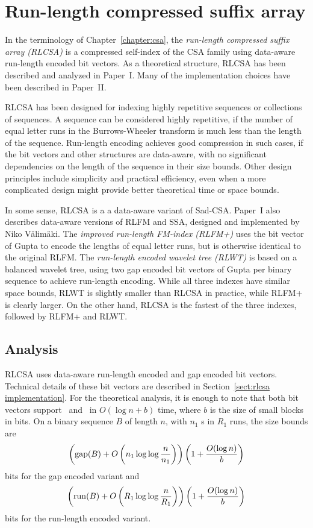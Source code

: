 \chapter{Run-length compressed suffix array}\label{chapter:rlcsa}

In the terminology of Chapter~\ref{chapter:csa}, the \emph{run-length compressed suffix array (RLCSA)} is a compressed self-index of the CSA family using data-aware run-length encoded bit vectors. As a theoretical structure, RLCSA has been described and analyzed in Paper~I. Many of the implementation choices have been described in Paper~II.

RLCSA has been designed for indexing highly repetitive sequences or collections of sequences. A sequence can be considered highly repetitive, if the number of equal letter runs in the Burrows-Wheeler transform is much less than the length of the sequence. Run-length encoding achieves good compression in such cases, if the bit vectors and other structures are data-aware, with no significant dependencies on the length of the sequence in their size bounds. Other design principles include simplicity and practical efficiency, even when a more complicated design might provide better theoretical time or space bounds.

In some sense, RLCSA is a a data-aware variant of Sad-CSA. Paper~I also describes data-aware versions of RLFM and SSA, designed and implemented by Niko Välimäki. The \emph{improved run-length FM-index (RLFM+)} uses the bit vector of Gupta  to encode the lengths of equal letter runs, but is otherwise identical to the original RLFM. The \emph{run-length encoded wavelet tree (RLWT)} is based on a balanced wavelet tree, using two gap encoded bit vectors of Gupta  per binary sequence to achieve run-length encoding. While all three indexes have similar space bounds, RLWT is slightly smaller than RLCSA in practice, while RLFM+ is clearly larger. On the other hand, RLCSA is the fastest of the three indexes, followed by RLFM+ and RLWT.
\newpage

\section{Analysis}\label{sect:rlcsa analysis}

RLCSA uses data-aware run-length encoded and gap encoded bit vectors. Technical details of these bit vectors are described in Section~\ref{sect:rlcsa implementation}. For the theoretical analysis, it is enough to note that both bit vectors support \rank\ and \select\ in $O(\log n + b)$ time, where $b$ is the size of small blocks in bits. On a binary sequence $B$ of length $n$, with $n_{1}$ \onebit{}s in $R_{1}$ runs, the size bounds are
$$
\left( \operatorname{gap}(B) + O\left( n_{1} \log \log \frac{n}{n_{1}} \right) \right)
\left( 1 + \frac{O(\log n)}{b} \right)
$$
bits for the gap encoded variant and
$$
\left( \operatorname{run}(B) + O\left( R_{1} \log \log \frac{n}{R_{1}} \right) \right)
\left( 1 + \frac{O(\log n)}{b} \right)
$$
bits for the run-length encoded variant.

